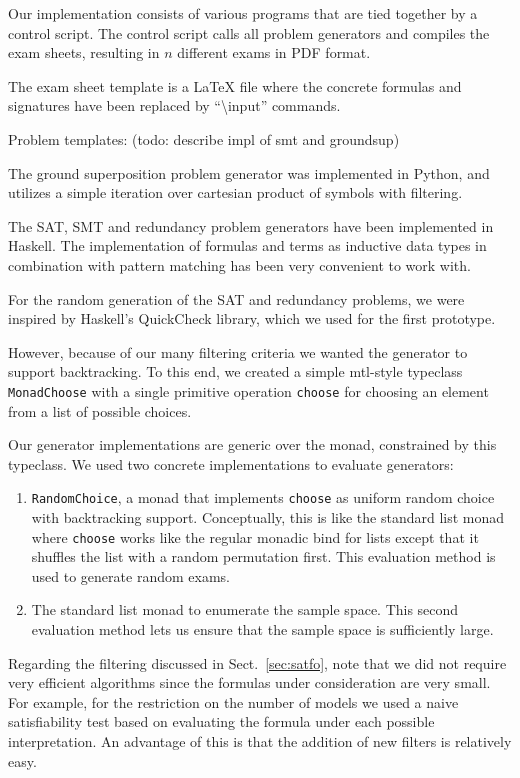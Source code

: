 Our implementation consists of various programs that are tied together by a control script.
The control script calls all problem generators
and compiles the exam sheets, resulting in $n$ different exams in PDF format.

The exam sheet template is a \LaTeX{} file
where the concrete formulas and signatures
have been replaced by ``\textbackslash{}input'' commands.



Problem templates: (todo: describe impl of smt and groundsup)


The ground superposition problem generator was implemented in Python,
and utilizes a simple iteration over cartesian product of symbols
with filtering.

The SAT, SMT and redundancy problem generators have been implemented in Haskell.
The implementation of formulas and terms as inductive data types
in combination with pattern matching has been very convenient to work with.

For the random generation of the SAT and redundancy problems,
we were inspired by Haskell's QuickCheck library,
which we used for the first prototype.

However, because of our many filtering criteria we wanted the generator to support backtracking.
To this end,
we created a simple mtl-style typeclass \texttt{MonadChoose}
with a single primitive operation \texttt{choose} for choosing an element from a list of possible choices.

Our generator implementations are generic over the monad, constrained by this typeclass.
We used two concrete implementations to evaluate generators:
\begin{enumerate}
    \item
        \texttt{RandomChoice}, a monad that implements \texttt{choose}
        as uniform random choice with backtracking support.
        Conceptually, this is like the standard list monad
        where \texttt{choose} works like the regular monadic bind for lists
        except that it shuffles the list with a random permutation first.
        This evaluation method is used to generate random exams.
    \item
        The standard list monad to enumerate the sample space.
        This second evaluation method lets us ensure that the sample space is sufficiently large.
\end{enumerate}

Regarding the filtering discussed in Sect.~\ref{sec:satfo},
note that we did not require very efficient algorithms since
the formulas under consideration are very small.
For example, for the restriction on the number of models we used a naive satisfiability test
based on evaluating the formula under each possible interpretation.
An advantage of this is that the addition of new filters is relatively easy.
